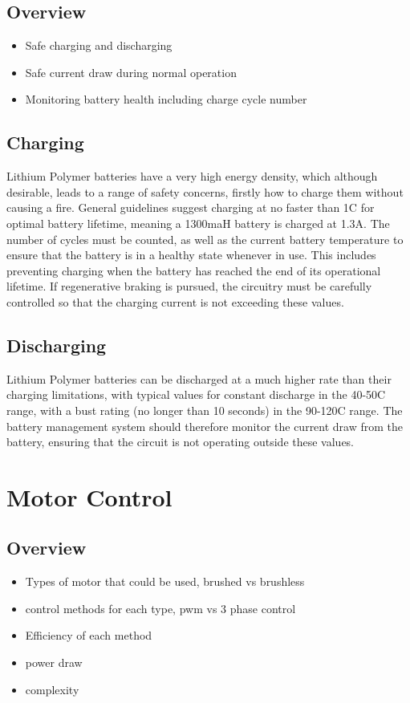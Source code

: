 \documentclass[journal,10pt]{IEEEtran}
\begin{document}
	\subsection{Overview}
		\begin{itemize}
			\item Safe charging and discharging 
			\item Safe current draw during normal operation
			\item Monitoring battery health including charge cycle number
		\end{itemize}
	\subsection{Charging}
		Lithium Polymer batteries have a very high energy density, which although desirable, leads to a range of safety concerns, firstly how to charge them without causing a fire.
		General guidelines suggest charging at no faster than 1C for optimal battery lifetime, meaning a 1300maH battery is charged at 1.3A.
		The number of cycles must be counted, as well as the current battery temperature to ensure that the battery is in a healthy state whenever in use.
		This includes preventing charging when the battery has reached the end of its operational lifetime.
		If regenerative braking is pursued, the circuitry must be carefully controlled so that the charging current is not exceeding these values.
	\subsection{Discharging}
		Lithium Polymer batteries can be discharged at a much higher rate than their charging limitations, with typical values for constant discharge in the 40-50C range, with a bust rating (no longer than 10 seconds) in the 90-120C range.
		The battery management system should therefore monitor the current draw from the battery, ensuring that the circuit is not operating outside these values.
\section{Motor Control}
	\subsection{Overview}
		\begin{itemize}
			\item Types of motor that could be used, brushed vs brushless
			\item control methods for each type, pwm vs 3 phase control
			\item Efficiency of each method
			\item power draw
			\item complexity
		\end{itemize}
\end{document}
